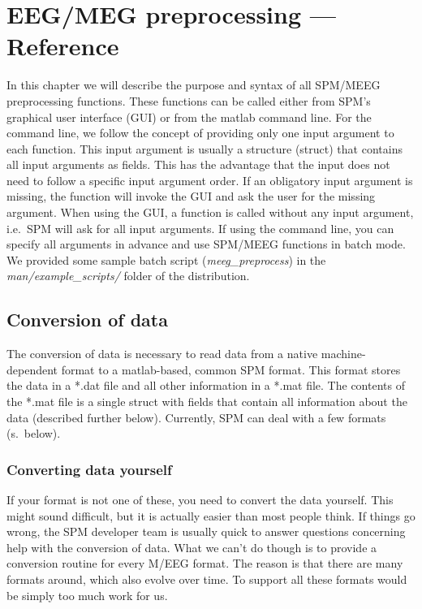 \chapter{EEG/MEG preprocessing --- Reference}
\label{ch:eeg_preprocessing}
In this chapter we will describe the purpose and syntax of all
SPM/MEEG preprocessing functions. These functions can be called either from
SPM's graphical user interface (GUI) or from the matlab command
line. For the command line, we follow the concept of providing only one input
argument to each function. This input argument is usually a structure (struct)
that contains all input arguments as fields. This has the advantage
that the input does not need to follow a specific input argument
order. If an obligatory input argument is missing, the function will
invoke the GUI and ask the user for the missing argument. When using
the GUI, a function is called without any input argument, i.e.~SPM
will ask for all input arguments. If using the command line, you
can specify all arguments in advance and use SPM/MEEG functions in
batch mode. We provided some sample batch script
(\textit{meeg\_preprocess}) in the \textit{man/example\_scripts/}
folder of the distribution.

\section{Conversion of data}
The conversion of data is necessary to read data from a native
machine-dependent format to a matlab-based, common SPM format. This
format stores the data in a *.dat file and all other information in a
*.mat file. The contents of the *.mat file is a single struct with
fields that contain all information about the data (described
further below). Currently, SPM can deal with a few formats (s.~below). 

\subsection{Converting data yourself}
If your format is not one of these, you need to convert the data
yourself. This might sound difficult, but it is actually easier than
most people think. If things go wrong, the SPM developer team is
usually quick to answer questions concerning help with the conversion
of data. What we can't do though is to provide a conversion routine
for every M/EEG format. The reason is that there are many formats
around, which also evolve over time. To support all these formats
would be simply too much work for us. 

